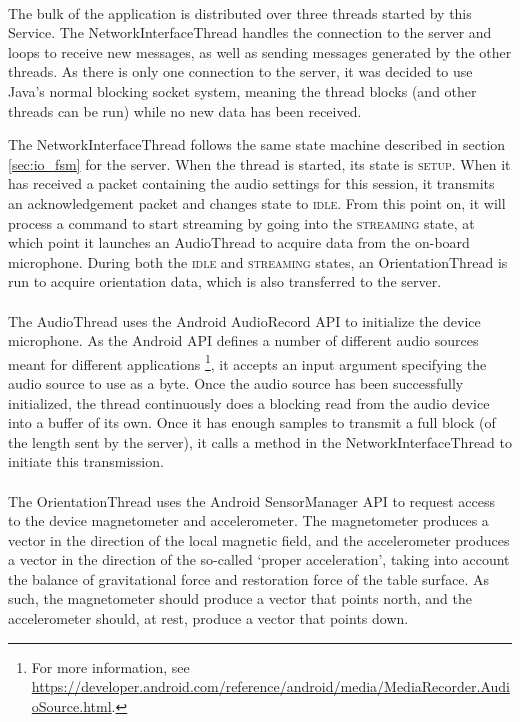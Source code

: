 \documentclass[a4paper, notitlepage]{report}
\begin{document}
\paragraph*{}
The bulk of the application is distributed over three threads started by this Service. The NetworkInterfaceThread handles the connection to the \matlab server and loops to receive new messages, as well as sending messages generated by the other threads. As there is only one connection to the server, it was decided to use Java's normal blocking socket system, meaning the thread blocks (and other threads can be run) while no new data has been received.

The NetworkInterfaceThread follows the same state machine described in section \ref{sec:io_fsm} for the \matlab server. When the thread is started, its state is \textsc{setup}. When it has received a packet containing the audio settings for this session, it transmits an acknowledgement packet and changes state to \textsc{idle}. From this point on, it will process a command to start streaming by going into the \textsc{streaming} state, at which point it launches an AudioThread to acquire data from the on-board microphone. During both the \textsc{idle} and \textsc{streaming} states, an OrientationThread is run to acquire orientation data, which is also transferred to the \matlab server.

\paragraph*{}
The AudioThread uses the Android AudioRecord API to initialize the device microphone. As the Android API defines a number of different audio sources meant for different applications \footnote{For more information, see \url{https://developer.android.com/reference/android/media/MediaRecorder.AudioSource.html}.}, it accepts an input argument specifying the audio source to use as a byte. Once the audio source has been successfully initialized, the thread continuously does a blocking read from the audio device into a buffer of its own. Once it has enough samples to transmit a full block (of the length sent by the server), it calls a method in the NetworkInterfaceThread to initiate this transmission. 

\paragraph*{}
The OrientationThread uses the Android SensorManager API to request access to the device magnetometer and accelerometer. The magnetometer produces a vector in the direction of the local magnetic field, and the accelerometer produces a vector in the direction of the so-called `proper acceleration', taking into account the balance of gravitational force and restoration force of the table surface. As such, the magnetometer should produce a vector that points north, and the accelerometer should, at rest, produce a vector that points down.
\end{document}
